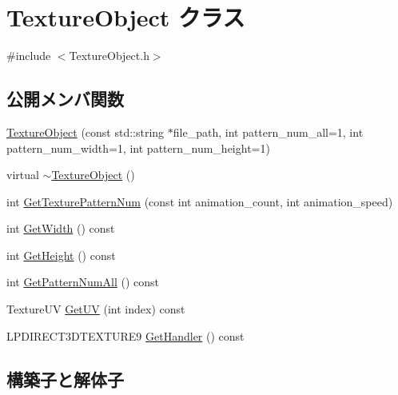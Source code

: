 \hypertarget{class_texture_object}{}\section{Texture\+Object クラス}
\label{class_texture_object}


{\ttfamily \#include $<$Texture\+Object.\+h$>$}

\subsection*{公開メンバ関数}
\begin{DoxyCompactItemize}
\item 
\mbox{\hyperlink{class_texture_object_add74bde2c60ec3d61229ce70b26602f2}{Texture\+Object}} (const std\+::string $\ast$file\+\_\+path, int pattern\+\_\+num\+\_\+all=1, int pattern\+\_\+num\+\_\+width=1, int pattern\+\_\+num\+\_\+height=1)
\item 
virtual \mbox{\hyperlink{class_texture_object_aeed25fa5ca8e892b96145f4a649e090a}{$\sim$\+Texture\+Object}} ()
\item 
int \mbox{\hyperlink{class_texture_object_a5bfee4b09a77e078a51117363a6ede34}{Get\+Texture\+Pattern\+Num}} (const int animation\+\_\+count, int animation\+\_\+speed)
\item 
int \mbox{\hyperlink{class_texture_object_a72c079770e7e4355b6481d28a0a472ac}{Get\+Width}} () const
\item 
int \mbox{\hyperlink{class_texture_object_af312bd8d8cdb31918a00e1fe096c26e0}{Get\+Height}} () const
\item 
int \mbox{\hyperlink{class_texture_object_a7d6efe951d81051ed4c763db1208aa40}{Get\+Pattern\+Num\+All}} () const
\item 
Texture\+UV \mbox{\hyperlink{class_texture_object_a51b8a2723302c2d38624a62f9205c4bb}{Get\+UV}} (int index) const
\item 
L\+P\+D\+I\+R\+E\+C\+T3\+D\+T\+E\+X\+T\+U\+R\+E9 \mbox{\hyperlink{class_texture_object_a1b6c93f36e03686f7198b93355c73c8a}{Get\+Handler}} () const
\end{DoxyCompactItemize}


\subsection{構築子と解体子}
\mbox{\label{class_texture_object_add74bde2c60ec3d61229ce70b26602f2}} 
